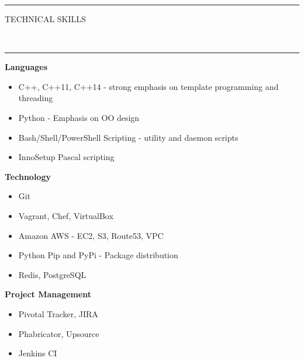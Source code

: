 \documentclass[10pt, letterpaper, oneside]{article}
\newcommand{\HRule}[2]{\textcolor{#1}{\rule{\linewidth}{#2}}}
\newcommand{\sectiontitle}[1]{\begin{minipage}{\textwidth}\HRule{black}{0.25mm}\vspace{-10pt}\begin{center}\Large\MakeUppercase{#1}\end{center}\end{minipage}\\\HRule{light-grey}{0.15mm}\vspace{\baselineskip}}
\newenvironment{ressection}[1]{
  \sectiontitle{#1}}
  {\vspace{0.5\baselineskip}}
\newcommand{\resitem}[1]{
    \vspace{2pt}
    \item \begin{flushleft} #1 \end{flushleft}
}
\newcommand{\restechentryheader}[1]{
    \vspace{-5pt}
    \textbf{#1}\\
}
\newenvironment{restechentry}[1]{
  \begin{minipage}{\textwidth}
    \restechentryheader{#1}
        \vspace{-\baselineskip}
    \begin{itemize}[noitemsep,nolistsep]
}{
    \end{itemize}
        \vspace{\baselineskip}
        \end{minipage}
}
\begin{document}
\begin{ressection}{Technical Skills}
  \begin{restechentry}{Languages}
    \resitem{C++, C++11, C++14 - strong emphasis on template programming and threading}
    \resitem{Python - Emphasis on OO design}
    \resitem{Bash/Shell/PowerShell Scripting - utility and daemon scripts}
    \resitem{InnoSetup Pascal scripting}
  \end{restechentry}
  \begin{multicols}{2}
    \begin{restechentry}{Technology}
      \resitem{Git}
      \resitem{Vagrant, Chef, VirtualBox}
      \resitem{Amazon AWS - EC2, S3, Route53, VPC}
      \resitem{Python Pip and PyPi - Package distribution}
      \resitem{Redis, PostgreSQL}
    \end{restechentry}
    \begin{restechentry}{Project Management}
      \resitem{Pivotal Tracker, JIRA}
      \resitem{Phabricator, Upsource}
      \resitem{Jenkins CI}
    \end{restechentry}
  \end{multicols}
\end{ressection}
\end{document}

